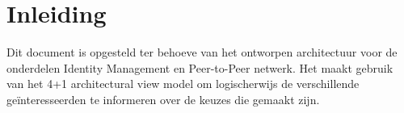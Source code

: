 \chapter{Inleiding}

Dit document is opgesteld ter behoeve van het ontworpen architectuur voor de onderdelen Identity Management en Peer-to-Peer netwerk. Het maakt gebruik van het 4+1 architectural view model om logischerwijs de verschillende geïnteresseerden te informeren over de keuzes die gemaakt zijn.